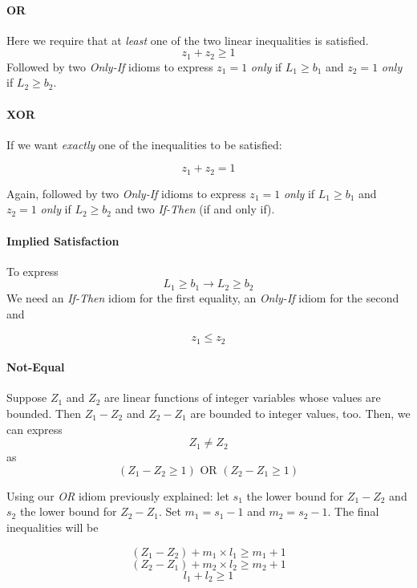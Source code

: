 \paragraph{OR \\}
Here we require that at \textit{least} one of the two linear inequalities is satisfied.
$$z_1 + z_2 \geq 1 $$
Followed by two \textit{Only-If} idioms to express $z_1 = 1$ \textit{only} if $L_1 \geq b_1$ and $z_2 = 1$ \textit{only} if $L_2 \geq b_2$.


\paragraph{XOR \\}
If we want \textit{exactly} one of the inequalities to be satisfied:

$$z_1 + z_2 = 1$$

Again, followed by two \textit{Only-If} idioms to express $z_1 = 1$ \textit{only} if $L_1 \geq b_1$ and $z_2 = 1$ \textit{only} if $L_2 \geq b_2$ and two \textit{If-Then} (if and only if).

\paragraph{Implied Satisfaction \\}
To express
$$ L_1 \geq b_1 \rightarrow L_2 \geq b_2$$
We need an \textit{If-Then} idiom for the first equality, an \textit{Only-If} idiom for the second and

$$z_1 \leq z_2$$

\paragraph{Not-Equal \\}

Suppose $Z_1$ and $Z_2$ are linear functions of integer variables whose values are bounded. Then $Z_1 - Z_2$ and $Z_2 - Z_1$ are bounded to integer values, too. Then, we can express
$$Z_1 \neq Z_2$$
as
$$(Z_1 - Z_2 \geq 1) \text{ OR } (Z_2 - Z_1 \geq 1) $$

Using our \textit{OR} idiom previously explained: let $s_1$ the lower bound for $Z_1 - Z_2$ and $s_2$ the lower bound for $Z_2 - Z_1$.
Set  $m_1 = s_1 - 1$ and $m_2 = s_2 - 1$. The final inequalities will be

$$(Z_1 - Z_2) + m_1 \times l_1 \geq m_1 + 1$$
$$(Z_2 - Z_1) + m_2 \times l_2 \geq m_2 + 1$$
$$ l_1 + l_2 \geq 1 $$